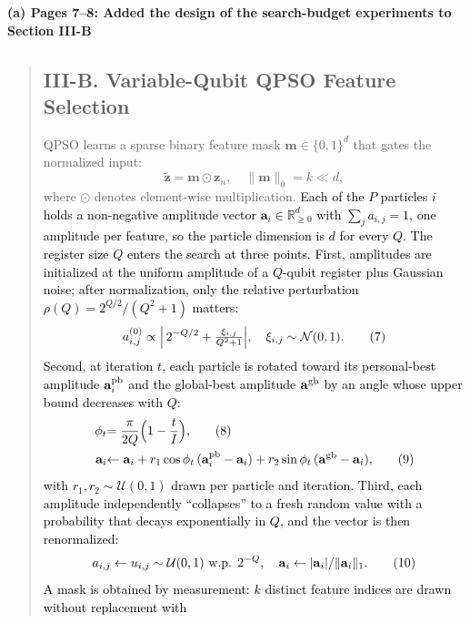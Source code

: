 \documentclass[11pt]{article}
\newenvironment{excerpt}{\begin{quote}\sloppy}{\end{quote}}
\newcommand{\mshead}[2]{\subsection*{\textbf{#1. #2}}}
\newcommand{\loc}[1]{\par\medskip\noindent\textbf{#1}\par}
\begin{document}
\loc{(a) Pages 7--8: Added the design of the search-budget experiments to Section III-B}
\begin{excerpt}
\mshead{III-B}{Variable-Qubit QPSO Feature Selection}


QPSO learns a sparse binary feature mask
$\mathbf{m}\in\{0,1\}^d$ that gates the normalized input:
\begin{equation}
\tilde{\mathbf{z}} = \mathbf{m}\odot\mathbf{z}_n,\quad
\|\mathbf{m}\|_0 = k \ll d,
\tag{6}
\end{equation}
where $\odot$ denotes element-wise multiplication.
\textcolor{black}{Each of the $P$ particles $i$ holds a
non-negative amplitude vector $\mathbf{a}_i\in\mathbb{R}_{\ge 0}^{d}$
with $\sum_j a_{i,j}=1$, one amplitude per feature, so the particle
dimension is $d$ for every $Q$. The register size $Q$ enters the
search at three points. First, amplitudes are initialized at the
uniform amplitude of a $Q$-qubit register plus Gaussian noise; after
normalization, only the relative perturbation
$\rho(Q)=2^{Q/2}/(Q^{2}+1)$ matters:}
\begin{equation}
\textcolor{black}{a_{i,j}^{(0)} \propto \Bigl|\,2^{-Q/2} +
\tfrac{\xi_{i,j}}{Q^{2}+1}\Bigr|,\quad
\xi_{i,j}\sim\mathcal{N}(0,1).}
\tag{7}
\end{equation}
\textcolor{black}{Second, at iteration $t$, each particle is
rotated toward its personal-best amplitude $\mathbf{a}_i^{\rm pb}$
and the global-best amplitude $\mathbf{a}^{\rm gb}$ by an angle whose
upper bound decreases with $Q$:}
\begin{align}
\textcolor{black}{\phi_t} &\textcolor{black}{= \frac{\pi}{2Q}\Bigl(1-\frac{t}{I}\Bigr),}
\tag{8}\\
\textcolor{black}{\mathbf{a}_i} &\textcolor{black}{\leftarrow \mathbf{a}_i
+ r_1\cos\phi_t\,(\mathbf{a}_i^{\rm pb}-\mathbf{a}_i)
+ r_2\sin\phi_t\,(\mathbf{a}^{\rm gb}-\mathbf{a}_i),}
\tag{9}
\end{align}
\textcolor{black}{with $r_1,r_2\sim\mathcal{U}(0,1)$ drawn per
particle and iteration. Third, each amplitude independently
``collapses'' to a fresh random value with a probability that decays
exponentially in $Q$, and the vector is then renormalized:}
\begin{equation}
\textcolor{black}{a_{i,j} \leftarrow u_{i,j}\sim\mathcal{U}(0,1)
\ \text{w.p. } 2^{-Q},\quad
\mathbf{a}_i \leftarrow |\mathbf{a}_i| / \|\mathbf{a}_i\|_1 .}
\tag{10}
\end{equation}
\textcolor{black}{A mask is obtained by measurement: $k$
distinct feature indices are drawn without replacement with
}
\end{excerpt}
\end{document}
